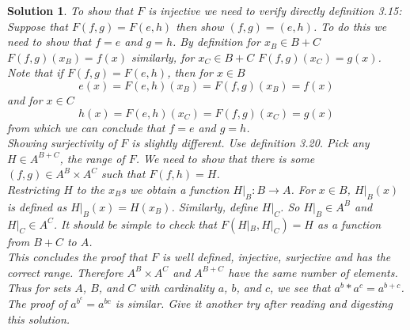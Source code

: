 \documentclass{article}
\theoremstyle{problemstyle}
\theoremstyle{problemstyle}
\newtheorem{solution}{Solution}
\theoremstyle{problemstyle}
\begin{document}
\begin{solution}
To show that $F$ is injective we need to verify directly definition 3.15:\\

Suppose that $F(f,g) = F(e,h)$ then show $(f,g) = (e,h)$. To do this we need to show that $f = e$ and $g = h$. By definition for $x_B \in B+C$ $F(f,g)(x_B) = f(x)$ similarly, for $x_C \in B+C$ $F(f,g)(x_C) = g(x)$. Note that if $F(f,g) = F(e,h)$, then for $x \in B$ $$e(x) = F(e,h)(x_B) = F(f,g)(x_B) = f(x)$$ and for $x \in C$ $$h(x) = F(e,h)(x_C) = F(f,g)(x_C) = g(x)$$ from which we can conclude that $f = e$ and $g = h$. \\

Showing surjectivity of $F$ is slightly different. Use definition 3.20. Pick any $H \in A^{B+C}$, the range of $F$. We need to show that there is some $(f,g) \in A^B \times A^C$ such that $F(f,h) = H$.\\

Restricting $H$ to the $x_B$s we obtain a function $H|_B:B \rightarrow A$. For $x \in B$, $H|_B(x)$ is defined as $H|_B(x) = H(x_B)$. Similarly, define $H|_C$. So $H|_B \in A^B$ and $H|_C \in A^C$. It should be simple to check that $F(H|_B,H|_C) = H$ as a function from $B+C$ to $A$.\\ 

This concludes the proof that $F$ is well defined, injective, surjective and has the correct range. Therefore $A^B \times A^C$ and $A^{B+C}$ have the same number of elements. Thus for sets $A$, $B$, and $C$ with cardinality $a$, $b$, and $c$, we see that $a^b * a^c = a^{b+c}$.\\

The proof of $a^{b^c} = a^{bc}$ is similar. Give it another try after reading and digesting this solution. 

\end{solution}
\end{document}
